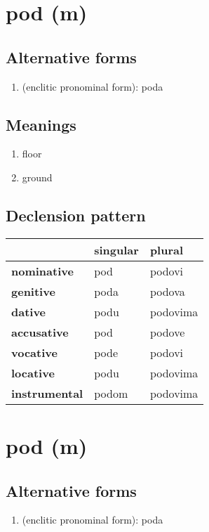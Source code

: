 \filbreak
\section{pod (m)}
\subsection*{Alternative forms}
\begin{enumerate}
\item (enclitic pronominal form): poda
\end{enumerate}
\subsection*{Meanings}
\begin{enumerate}
\item floor
\item ground
\end{enumerate}
\subsection*{Declension pattern}
\begin{tabularx}{\linewidth}{Xll}
\toprule
{} & singular &    plural \\
\midrule
\textbf{nominative  } &      pod &    podovi \\
\textbf{genitive    } &     poda &    podova \\
\textbf{dative      } &     podu &  podovima \\
\textbf{accusative  } &      pod &    podove \\
\textbf{vocative    } &     pode &    podovi \\
\textbf{locative    } &     podu &  podovima \\
\textbf{instrumental} &    podom &  podovima \\
\bottomrule
\end{tabularx}

\filbreak
\section{pod (m)}
\subsection*{Alternative forms}
\begin{enumerate}
\item (enclitic pronominal form): poda
\end{enumerate}
